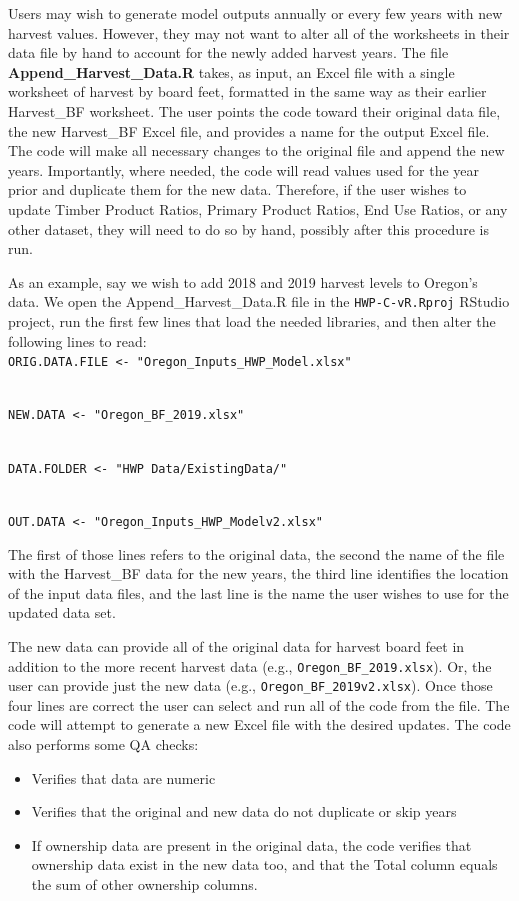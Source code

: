 \documentclass[
  openany]{book}
\begin{document}
Users may wish to generate model outputs annually or every few years
with new harvest values. However, they may not want to alter all of the
worksheets in their data file by hand to account for the newly added
harvest years. The file \textbf{Append\_Harvest\_Data.R} takes, as
input, an Excel file with a single worksheet of harvest by board feet,
formatted in the same way as their earlier Harvest\_BF worksheet. The
user points the code toward their original data file, the new
Harvest\_BF Excel file, and provides a name for the output Excel file.
The code will make all necessary changes to the original file and append
the new years. Importantly, where needed, the code will read values used
for the year prior and duplicate them for the new data. Therefore, if
the user wishes to update Timber Product Ratios, Primary Product Ratios,
End Use Ratios, or any other dataset, they will need to do so by hand,
possibly after this procedure is run.

As an example, say we wish to add 2018 and 2019 harvest levels to
Oregon's data. We open the Append\_Harvest\_Data.R file in the
\texttt{HWP-C-vR.Rproj} RStudio project, run the first few lines that
load the needed libraries, and then alter the following lines to read:\\
\texttt{ORIG.DATA.FILE\ \textless{}-\ "Oregon\_Inputs\_HWP\_Model.xlsx"}\strut \\
\texttt{NEW.DATA\ \textless{}-\ "Oregon\_BF\_2019.xlsx"}\strut \\
\texttt{DATA.FOLDER\ \textless{}-\ "HWP\ Data/ExistingData/"}\strut \\
\texttt{OUT.DATA\ \textless{}-\ "Oregon\_Inputs\_HWP\_Modelv2.xlsx"}

The first of those lines refers to the original data, the second the
name of the file with the Harvest\_BF data for the new years, the third
line identifies the location of the input data files, and the last line
is the name the user wishes to use for the updated data set.

The new data can provide all of the original data for harvest board feet
in addition to the more recent harvest data (e.g.,
\texttt{Oregon\_BF\_2019.xlsx}). Or, the user can provide just the new
data (e.g., \texttt{Oregon\_BF\_2019v2.xlsx}). Once those four lines are
correct the user can select and run all of the code from the file. The
code will attempt to generate a new Excel file with the desired updates.
The code also performs some QA checks:

\begin{itemize}
\item
  Verifies that data are numeric
\item
  Verifies that the original and new data do not duplicate or skip years
\item
  If ownership data are present in the original data, the code verifies
  that ownership data exist in the new data too, and that the Total
  column equals the sum of other ownership columns.
\end{itemize}
\end{document}
